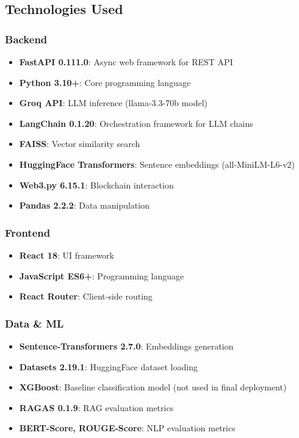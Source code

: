 \documentclass[12pt,singleside,a4paper]{article}
\begin{document}
\subsection{Technologies Used}

\subsubsection{Backend}
\begin{itemize}
\item \textbf{FastAPI 0.111.0}: Async web framework for REST API
\item \textbf{Python 3.10+}: Core programming language
\item \textbf{Groq API}: LLM inference (llama-3.3-70b model)
\item \textbf{LangChain 0.1.20}: Orchestration framework for LLM chains
\item \textbf{FAISS}: Vector similarity search
\item \textbf{HuggingFace Transformers}: Sentence embeddings (all-MiniLM-L6-v2)
\item \textbf{Web3.py 6.15.1}: Blockchain interaction
\item \textbf{Pandas 2.2.2}: Data manipulation
\end{itemize}

\subsubsection{Frontend}
\begin{itemize}
\item \textbf{React 18}: UI framework
\item \textbf{JavaScript ES6+}: Programming language
\item \textbf{React Router}: Client-side routing
\end{itemize}

\subsubsection{Data \& ML}
\begin{itemize}
\item \textbf{Sentence-Transformers 2.7.0}: Embeddings generation
\item \textbf{Datasets 2.19.1}: HuggingFace dataset loading
\item \textbf{XGBoost}: Baseline classification model (not used in final deployment)
\item \textbf{RAGAS 0.1.9}: RAG evaluation metrics
\item \textbf{BERT-Score, ROUGE-Score}: NLP evaluation metrics
\end{itemize}
\end{document}
